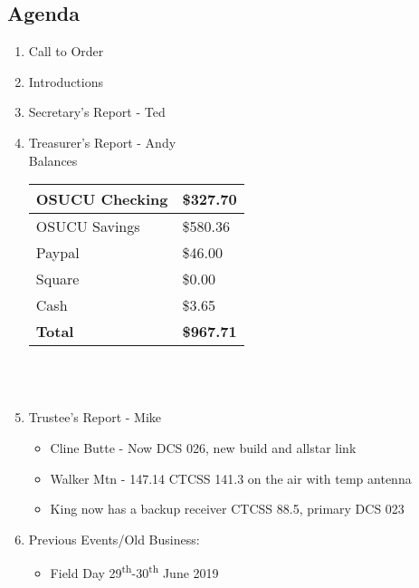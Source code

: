 \documentclass[letter,11pt]{extarticle}
\begin{document}
	\subsection*{Agenda}
	\begin{enumerate}
		\item Call to Order
		\item Introductions
		\item Secretary's Report - Ted
		\item Treasurer's Report - Andy \\
				Balances 
			\begin{tabular}{|l|l|} \hline
				OSUCU Checking & \$327.70 \\ \hline
				OSUCU Savings & \$580.36 \\ \hline
				Paypal & \$46.00 \\ \hline
				Square & \$0.00 \\ \hline
				Cash & \$3.65 \\ \hline
				\textbf{Total} & \textbf{\$967.71} \\ \hline
			\end{tabular} \\ \\
		\item Trustee's Report - Mike
			\begin{itemize}
				\item Cline Butte - Now DCS 026, new build and allstar link
				\item Walker Mtn - 147.14 CTCSS 141.3 on the air with temp antenna
				\item King now has a backup receiver CTCSS 88.5, primary DCS 023
			\end{itemize}
		\item Previous Events/Old Business:
		\begin{itemize}
				\item Field Day 29\textsuperscript{th}-30\textsuperscript{th} June 2019
		\end{itemize}
			

\end{enumerate}
\end{document}
